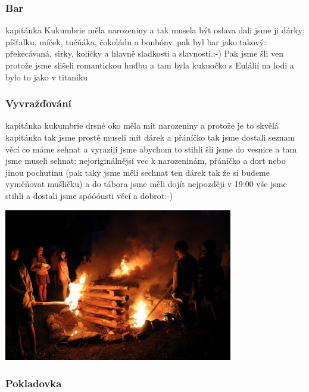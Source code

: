 \subsubsection{Bar} %
\label{ssub:bar1}

kapitánka Kukumbrie měla narozeniny a tak musela být oslava dali jsme ji dárky: píšťalku, míček, tučňáka, čokoládu a bonbóny. pak byl bar jako takový: překecávaná, sirky, kolíčky a hlavně sladkosti a slavnosti.:-) Pak jsme šli ven protože jsme slišeli romantickou hudbu a tam byla kukuočko s Eulálií na lodi a bylo to jako v titaniku



\subsubsection{Vyvražďování} %
\label{ssub:vyvražďování}

kapitánka kukumbrie drsné oko měla mít narozeniny a protože je to skvělá kapitánka tak jsme prostě museli mít dárek a přáníčko tak jsme dostali seznam věcí co máme sehnat a vyrazili jsme abychom to stihli šli jsme do vesnice a tam jsme museli sehnat: nejoriginálnějsí vec k narozeninám, přáníčko a dort nebo jinou pochutinu (pak taky jsme měli sechnat ten dárek tak že si budeme vyměňovat mušličku) a do tábora jsme měli dojít nejpozději v 19:00 vše jsme stihli a dostali jsme spóóóusti věcí a dobrot:-)


\begin{center}
	\includegraphics[width=10cm]{img/anpetu_tabor/taborak.JPG}
\end{center}

\subsubsection{Pokladovka} %
\label{ssub:pokladovka}

